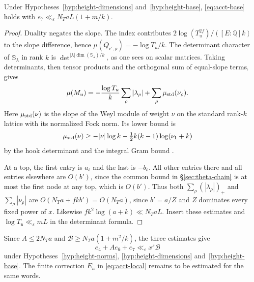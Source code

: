 \begin{proposition}\label{prop:height-base}
Under Hypotheses~\ref{hyp:height-dimensions} and~\ref{hyp:height-base},
\eqref{eq:acct-base} holds with
$e_7\ll_\varepsilon N_T aL(1+m/k)$.
\end{proposition}

\begin{proof}
Duality negates the slope. The index contributes
$2\log(T_u^{2f})/([E:\mathbb Q]k)$ to the slope difference, hence
$\mu(Q_{c',\rho})=-\log T_u/k$. The determinant character of
$\mathbb S_\lambda$ in rank $k$ is
$\det^{|\lambda|\dim(\mathbb S_\lambda)/k}$, as one sees on scalar
matrices. Taking determinants, then tensor products and the
orthogonal sum of equal-slope terms, gives
\[
 \mu(M_u)=-\frac{\log T_u}{k}\sum_\rho|\lambda_\rho|
                       +\sum_\rho\mu_{\rm std}(\nu_\rho).
\]
Here $\mu_{\rm std}(\nu)$ is the slope of the Weyl module of weight
$\nu$ on the standard rank-$k$ lattice with its normalized Fock norm.
Its lower bound is
\[
 \mu_{\rm std}(\nu)\ge
       -|\nu|\log k-\tfrac12k(k-1)\log(\nu_1+k)
\]
by the hook determinant and the integral Gram bound
\citep[Lemma~15.29 and Proposition~15.30]{adriazola-grh}.

At a top, the first entry is $a_t$ and the last is $-b_t$. All other
entries there and all entries elsewhere are $O(b')$, since the common
bound in \S\ref{sec:theta-chain} is at most the first node at any top,
which is $O(b')$. Thus both $\sum_\rho(|\lambda_\rho|)_+$ and
$\sum_\rho|\nu_\rho|$ are $O(N_Ta+fkb')=O(N_Ta)$, since
$b'=a/Z$ and $Z$ dominates every fixed power of $x$. Likewise
$fk^2\log(a+k)\ll N_TaL$. Insert these estimates and
$\log T_u\ll_\varepsilon mL$ in the determinant formula.
\end{proof}

Since $A\le2N_Ta$ and $\mathcal B\ge N_Ta(1+m^2/k)$, the three
estimates give
\[
 e_4+A e_6+e_7\ll_\varepsilon x^\varepsilon\mathcal B
\]
under Hypotheses~\ref{hyp:height-norms}, \ref{hyp:height-dimensions}
and~\ref{hyp:height-base}. The finite correction $E_u$ in
\eqref{eq:acct-local} remains to be estimated for the same words.

